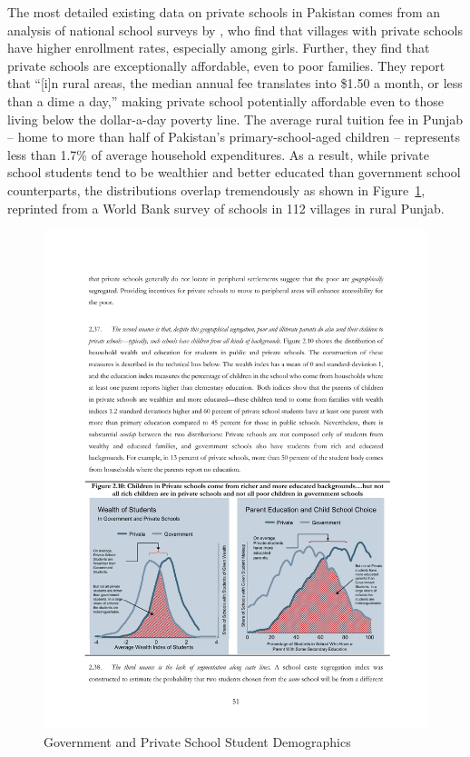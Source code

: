 \documentclass[12pt]{article}
\begin{document}
The most detailed existing data on private schools in Pakistan comes from an analysis of national school surveys by \cite{Andrabi:2008ji}, who find that villages with private schools have higher enrollment rates, especially among girls. Further, they find that private schools are exceptionally affordable, even to poor families. They report that ``[i]n rural areas, the median annual fee translates into \$1.50 a month, or less than a dime a day,'' making private school potentially affordable even to those living below the dollar-a-day poverty line. The average rural tuition fee in Punjab -- home to more than half of Pakistan's primary-school-aged children -- represents less than 1.7\% of average household expenditures. As a result, while private school students tend to be wealthier and better educated than government school counterparts, the distributions overlap tremendously as shown in Figure~\ref{overlapwealtheduc}, reprinted from a World Bank survey of schools in 112 villages in rural Punjab.

\begin{figure}[htb]
	\begin{center}
	\caption{Government and Private School Student Demographics}\label{overlapwealtheduc}
	\includegraphics[scale=1.0]{graphs/distributional_overlap.pdf}
	\end{center}
\end{figure}
\end{document}

